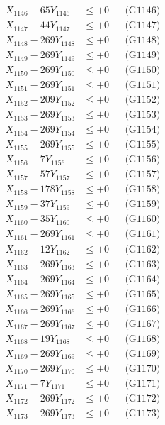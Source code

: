 \documentclass[a4paper,10pt]{article}
\begin{document}
{\begin{align}
X_{1146} - 65Y_{1146} &\leq +0 && \text{(G1146)} \\
X_{1147} - 44Y_{1147} &\leq +0 && \text{(G1147)} \\
X_{1148} - 269Y_{1148} &\leq +0 && \text{(G1148)} \\
X_{1149} - 269Y_{1149} &\leq +0 && \text{(G1149)} \\
X_{1150} - 269Y_{1150} &\leq +0 && \text{(G1150)} \\
\allowbreak
X_{1151} - 269Y_{1151} &\leq +0 && \text{(G1151)} \\
X_{1152} - 209Y_{1152} &\leq +0 && \text{(G1152)} \\
X_{1153} - 269Y_{1153} &\leq +0 && \text{(G1153)} \\
X_{1154} - 269Y_{1154} &\leq +0 && \text{(G1154)} \\
X_{1155} - 269Y_{1155} &\leq +0 && \text{(G1155)} \\
X_{1156} - 7Y_{1156} &\leq +0 && \text{(G1156)} \\
X_{1157} - 57Y_{1157} &\leq +0 && \text{(G1157)} \\
X_{1158} - 178Y_{1158} &\leq +0 && \text{(G1158)} \\
X_{1159} - 37Y_{1159} &\leq +0 && \text{(G1159)} \\
X_{1160} - 35Y_{1160} &\leq +0 && \text{(G1160)} \\
\allowbreak
X_{1161} - 269Y_{1161} &\leq +0 && \text{(G1161)} \\
X_{1162} - 12Y_{1162} &\leq +0 && \text{(G1162)} \\
X_{1163} - 269Y_{1163} &\leq +0 && \text{(G1163)} \\
X_{1164} - 269Y_{1164} &\leq +0 && \text{(G1164)} \\
X_{1165} - 269Y_{1165} &\leq +0 && \text{(G1165)} \\
X_{1166} - 269Y_{1166} &\leq +0 && \text{(G1166)} \\
X_{1167} - 269Y_{1167} &\leq +0 && \text{(G1167)} \\
X_{1168} - 19Y_{1168} &\leq +0 && \text{(G1168)} \\
X_{1169} - 269Y_{1169} &\leq +0 && \text{(G1169)} \\
X_{1170} - 269Y_{1170} &\leq +0 && \text{(G1170)} \\
\allowbreak
X_{1171} - 7Y_{1171} &\leq +0 && \text{(G1171)} \\
X_{1172} - 269Y_{1172} &\leq +0 && \text{(G1172)} \\
X_{1173} - 269Y_{1173} &\leq +0 && \text{(G1173)} \\

\end{align}}
\end{document}
